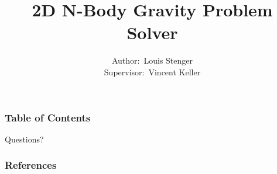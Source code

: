 \documentclass[11pt]{beamer}
\begin{document}
	\author{Author:~Louis Stenger\\Supervisor:~Vincent Keller}
	\title{2D N-Body Gravity Problem Solver}
	\date{}
	\begin{frame}
		\maketitle
	\end{frame}
	
	\begin{frame}
		\frametitle{Table of Contents}
		\tableofcontents[subsubsectionstyle=hide]
	\end{frame}
	
	
	
	
	\begin{frame}[standout]
		Questions?
	\end{frame}
	\begin{frame}[t,allowframebreaks]
		\frametitle{References}
		\renewcommand{\bibfont}{\normalfont\footnotesize}
		\printbibliography[heading=none]
	\end{frame}
	
\end{document}

